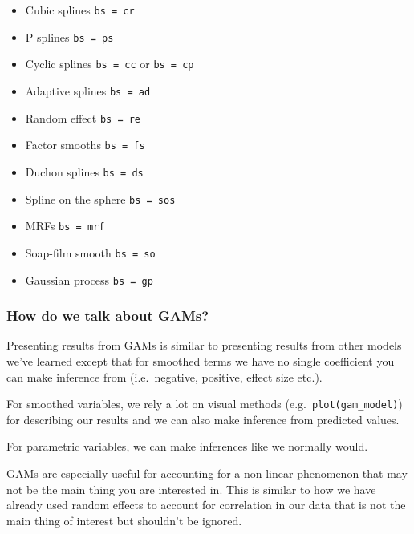 \documentclass[
  openany]{book}
\providecommand{\tightlist}{%
  \setlength{\itemsep}{0pt}\setlength{\parskip}{0pt}}
\begin{document}
\begin{itemize}
\tightlist
\item
  Cubic splines \texttt{bs\ =\ \textquotesingle{}cr\textquotesingle{}}
\item
  P splines \texttt{bs\ =\ \textquotesingle{}ps\textquotesingle{}}
\item
  Cyclic splines \texttt{bs\ =\ \textquotesingle{}cc\textquotesingle{}} or \texttt{bs\ =\ \textquotesingle{}cp\textquotesingle{}}
\item
  Adaptive splines \texttt{bs\ =\ \textquotesingle{}ad\textquotesingle{}}
\item
  Random effect \texttt{bs\ =\ \textquotesingle{}re\textquotesingle{}}
\item
  Factor smooths \texttt{bs\ =\ \textquotesingle{}fs\textquotesingle{}}
\item
  Duchon splines \texttt{bs\ =\ \textquotesingle{}ds\textquotesingle{}}
\item
  Spline on the sphere \texttt{bs\ =\ \textquotesingle{}sos\textquotesingle{}}
\item
  MRFs \texttt{bs\ =\ \textquotesingle{}mrf\textquotesingle{}}
\item
  Soap-film smooth \texttt{bs\ =\ \textquotesingle{}so\textquotesingle{}}
\item
  Gaussian process \texttt{bs\ =\ \textquotesingle{}gp\textquotesingle{}}
\end{itemize}

\hypertarget{how-do-we-talk-about-gams}{%
\subsubsection{How do we talk about GAMs?}\label{how-do-we-talk-about-gams}}

Presenting results from GAMs is similar to presenting results from other models we've learned except that for smoothed terms we have no single coefficient you can make inference from (i.e.~negative, positive, effect size etc.).

For smoothed variables, we rely a lot on visual methods (e.g.~\texttt{plot(gam\_model)}) for describing our results and we can also make inference from predicted values.

For parametric variables, we can make inferences like we normally would.

GAMs are especially useful for accounting for a non-linear phenomenon that may not be the main thing you are interested in. This is similar to how we have already used random effects to account for correlation in our data that is not the main thing of interest but shouldn't be ignored.
\end{document}
